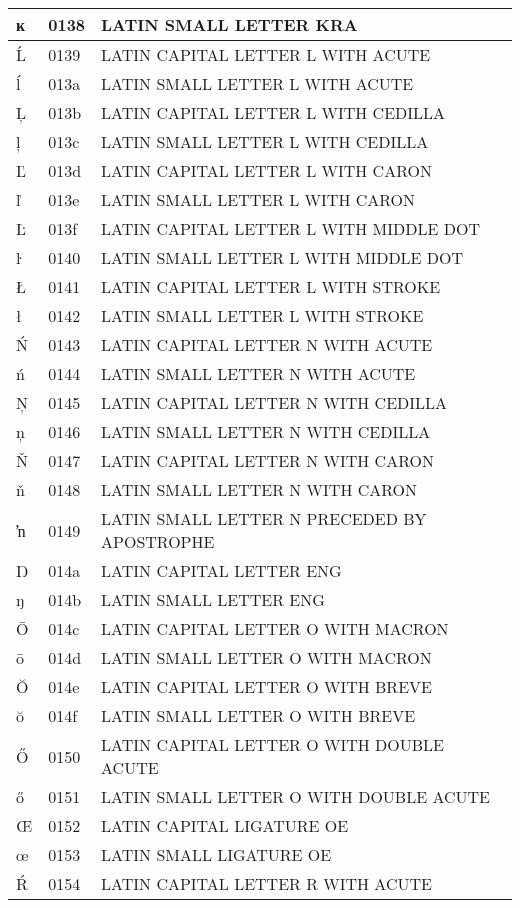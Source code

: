 \documentclass[12pt,letterpaper,openany]{book}
\begin{document}
\begin{center}
\begin{supertabular}{|m{0.25in}|m{0.5in}|m{4in}|}
ĸ & 0138 & LATIN SMALL LETTER KRA\\\hline
Ĺ & 0139 & LATIN CAPITAL LETTER L WITH ACUTE\\\hline
ĺ & 013a & LATIN SMALL LETTER L WITH ACUTE\\\hline
Ļ & 013b & LATIN CAPITAL LETTER L WITH CEDILLA\\\hline
ļ & 013c & LATIN SMALL LETTER L WITH CEDILLA\\\hline
Ľ & 013d & LATIN CAPITAL LETTER L WITH CARON\\\hline
ľ & 013e & LATIN SMALL LETTER L WITH CARON\\\hline
Ŀ & 013f & LATIN CAPITAL LETTER L WITH MIDDLE DOT\\\hline
ŀ & 0140 & LATIN SMALL LETTER L WITH MIDDLE DOT\\\hline
Ł & 0141 & LATIN CAPITAL LETTER L WITH STROKE\\\hline
ł & 0142 & LATIN SMALL LETTER L WITH STROKE\\\hline
Ń & 0143 & LATIN CAPITAL LETTER N WITH ACUTE\\\hline
ń & 0144 & LATIN SMALL LETTER N WITH ACUTE\\\hline
Ņ & 0145 & LATIN CAPITAL LETTER N WITH CEDILLA\\\hline
ņ & 0146 & LATIN SMALL LETTER N WITH CEDILLA\\\hline
Ň & 0147 & LATIN CAPITAL LETTER N WITH CARON\\\hline
ň & 0148 & LATIN SMALL LETTER N WITH CARON\\\hline
ŉ & 0149 & LATIN SMALL LETTER N PRECEDED BY APOSTROPHE\\\hline
Ŋ & 014a & LATIN CAPITAL LETTER ENG\\\hline
ŋ & 014b & LATIN SMALL LETTER ENG\\\hline
Ō & 014c & LATIN CAPITAL LETTER O WITH MACRON\\\hline
ō & 014d & LATIN SMALL LETTER O WITH MACRON\\\hline
Ŏ & 014e & LATIN CAPITAL LETTER O WITH BREVE\\\hline
ŏ & 014f & LATIN SMALL LETTER O WITH BREVE\\\hline
Ő & 0150 & LATIN CAPITAL LETTER O WITH DOUBLE ACUTE\\\hline
ő & 0151 & LATIN SMALL LETTER O WITH DOUBLE ACUTE\\\hline
Œ & 0152 & LATIN CAPITAL LIGATURE OE\\\hline
œ & 0153 & LATIN SMALL LIGATURE OE\\\hline
Ŕ & 0154 & LATIN CAPITAL LETTER R WITH ACUTE\\\hline

\end{supertabular}
\end{center}
\end{document}
